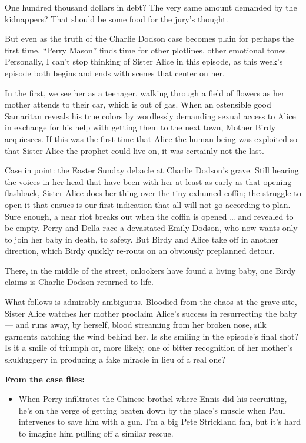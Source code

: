 One hundred thousand dollars in debt? The very same amount demanded by
the kidnappers? That should be some food for the jury's thought.

But even as the truth of the Charlie Dodson case becomes plain for
perhaps the first time, ``Perry Mason'' finds time for other plotlines,
other emotional tones. Personally, I can't stop thinking of Sister Alice
in this episode, as this week's episode both begins and ends with scenes
that center on her.

In the first, we see her as a teenager, walking through a field of
flowers as her mother attends to their car, which is out of gas. When an
ostensible good Samaritan reveals his true colors by wordlessly
demanding sexual access to Alice in exchange for his help with getting
them to the next town, Mother Birdy acquiesces. If this was the first
time that Alice the human being was exploited so that Sister Alice the
prophet could live on, it was certainly not the last.

Case in point: the Easter Sunday debacle at Charlie Dodson's grave.
Still hearing the voices in her head that have been with her at least as
early as that opening flashback, Sister Alice does her thing over the
tiny exhumed coffin; the struggle to open it that ensues is our first
indication that all will not go according to plan. Sure enough, a near
riot breaks out when the coffin is opened \ldots{} and revealed to be
empty. Perry and Della race a devastated Emily Dodson, who now wants
only to join her baby in death, to safety. But Birdy and Alice take off
in another direction, which Birdy quickly re-routs on an obviously
preplanned detour.

There, in the middle of the street, onlookers have found a living baby,
one Birdy claims is Charlie Dodson returned to life.

What follows is admirably ambiguous. Bloodied from the chaos at the
grave site, Sister Alice watches her mother proclaim Alice's success in
resurrecting the baby --- and runs away, by herself, blood streaming
from her broken nose, silk garments catching the wind behind her. Is she
smiling in the episode's final shot? Is it a smile of triumph or, more
likely, one of bitter recognition of her mother's skulduggery in
producing a fake miracle in lieu of a real one?

\textbf{From the case files:}

\begin{itemize}
\tightlist
\item
  When Perry infiltrates the Chinese brothel where Ennis did his
  recruiting, he's on the verge of getting beaten down by the place's
  muscle when Paul intervenes to save him with a gun. I'm a big Pete
  Strickland fan, but it's hard to imagine him pulling off a similar
  rescue.
\end{itemize}

